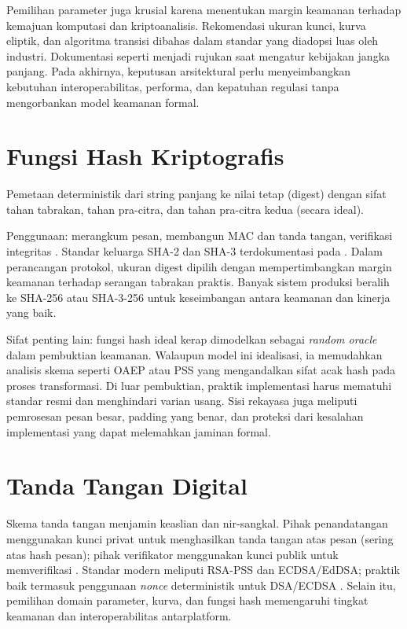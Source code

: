 \documentclass[../main.tex]{subfiles}
\begin{document}
Pemilihan parameter juga krusial karena menentukan margin keamanan terhadap kemajuan komputasi dan kriptoanalisis. Rekomendasi ukuran kunci, kurva eliptik, dan algoritma transisi dibahas dalam standar yang diadopsi luas oleh industri. Dokumentasi seperti \citep{nist_sp_800_56a_r3,nist_sp_800_131a} menjadi rujukan saat mengatur kebijakan jangka panjang. Pada akhirnya, keputusan arsitektural perlu menyeimbangkan kebutuhan interoperabilitas, performa, dan kepatuhan regulasi tanpa mengorbankan model keamanan formal.

\section{Fungsi Hash Kriptografis}
\begin{definition}
Pemetaan deterministik dari string panjang ke nilai tetap (digest) dengan sifat tahan tabrakan, tahan pra-citra, dan tahan pra-citra kedua (secara ideal).
\end{definition}
Penggunaan: merangkum pesan, membangun MAC dan tanda tangan, verifikasi integritas \citep{menezes}. Standar keluarga SHA-2 dan SHA-3 terdokumentasi pada \citep{fips180-4,fips202}. Dalam perancangan protokol, ukuran digest dipilih dengan mempertimbangkan margin keamanan terhadap serangan tabrakan praktis. Banyak sistem produksi beralih ke SHA-256 atau SHA-3-256 untuk keseimbangan antara keamanan dan kinerja yang baik.

Sifat penting lain: fungsi hash ideal kerap dimodelkan sebagai \emph{random oracle} dalam pembuktian keamanan. Walaupun model ini idealisasi, ia memudahkan analisis skema seperti OAEP atau PSS yang mengandalkan sifat acak hash pada proses transformasi. Di luar pembuktian, praktik implementasi harus mematuhi standar resmi dan menghindari varian usang. Sisi rekayasa juga meliputi pemrosesan pesan besar, padding yang benar, dan proteksi dari kesalahan implementasi yang dapat melemahkan jaminan formal.

\section{Tanda Tangan Digital}
Skema tanda tangan menjamin keaslian dan nir-sangkal. Pihak penandatangan menggunakan kunci privat untuk menghasilkan tanda tangan atas pesan (sering atas hash pesan); pihak verifikator menggunakan kunci publik untuk memverifikasi \citep{katzlindell}. Standar modern meliputi RSA-PSS dan ECDSA/EdDSA; praktik baik termasuk penggunaan \emph{nonce} deterministik untuk DSA/ECDSA \citep{rfc8017,fips186-5,rfc6979}. Selain itu, pemilihan domain parameter, kurva, dan fungsi hash memengaruhi tingkat keamanan dan interoperabilitas antarplatform.
\end{document}
